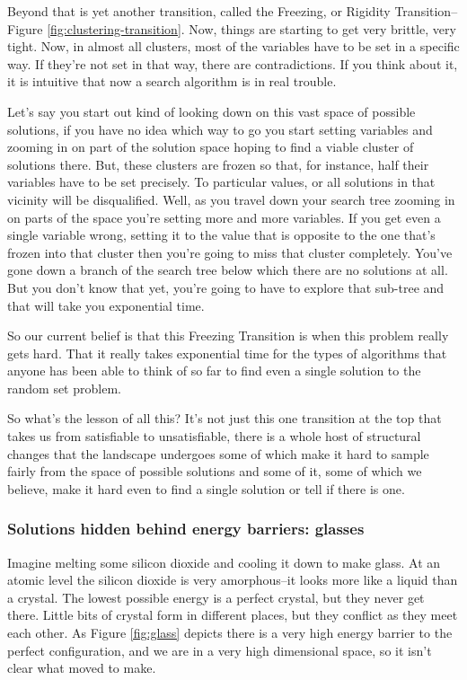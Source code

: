 \documentclass[]{article}
\begin{document}
Beyond that is yet another transition, called the Freezing,
or Rigidity Transition--Figure \ref{fig:clustering-transition}.
Now, things are starting to get 
very brittle,
very tight.
Now, in almost all clusters,
most of the variables have to be set in
a specific way.
If they're not set in that way, there are
contradictions.
If you think about it, it is intuitive
that now a search algorithm
is in real trouble.

Let's say you start out kind of looking
down on this
vast space of possible solutions, if you
have no idea which way to go
you start setting variables and zooming
in on part of the solution space
hoping to find a viable cluster of
solutions there.
But, these clusters are frozen so that,
for instance, half their variables
have to be set precisely.
To particular values, or all solutions in
that vicinity will be disqualified.
Well, as you travel down your search tree
zooming in on parts of the space
you're setting more and more variables.
If you get even a single variable wrong,
setting it to the value that is opposite
to the one that's frozen into
that cluster then you're going to miss
that cluster completely.
You've gone down a branch of the
search tree below which there are no
solutions at all.
But you don't know that yet,
you're going to have to explore
that sub-tree and that will take you
exponential time.

So our current belief is that this 
Freezing Transition
is when this problem really gets hard.
That it really takes exponential time for
the types of algorithms that
anyone has been able to think of so far
to find even a single solution to the
random set problem.

So what's the lesson of all this?
It's not just this one transition at
the top
that takes us from satisfiable to
unsatisfiable,
there is a whole host of structural
changes that the landscape undergoes
some of which make it hard to sample
fairly
from the space of possible solutions
and some of it, some of which
we believe, make it hard even to
find a single solution
or tell if there is one.

\subsubsection{Solutions hidden behind energy barriers: glasses}

Imagine melting some silicon dioxide and cooling it down to make glass. At an atomic level the silicon dioxide is very amorphous--it looks more like a liquid than a crystal. The lowest possible energy is a perfect crystal, but they never get there. Little bits of crystal form in different places, but they conflict as they meet each other. As Figure \ref{fig:glass} depicts there is a very high energy barrier to the perfect configuration, and we are in a very high dimensional space, so it isn't clear what moved to make.
\end{document}
